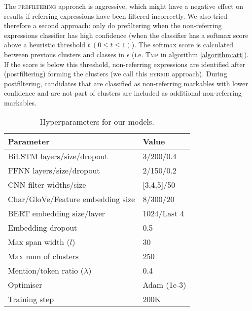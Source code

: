 \documentclass[10pt, a4paper]{article}
\newcommand{\ACRO}[1]{\textsc{#1}}
\newcommand{\PREFILTERING}{\ACRO{prefiltering}}
\newcommand{\HYBRID}{\ACRO{hybrid}}
\begin{document}
The {\PREFILTERING} approach is aggressive,  which might have a negative effect on results if referring expressions have been filtered incorrectly. 
We also tried therefore a second approach: only do prefiltering when the non-referring expressions classifier has high confidence (when the classifier has a softmax score above a heuristic threshold $t\ (0 \leq t \leq 1)$). The softmax score is calculated between previous clusters and classes in $\epsilon$ (i.e. \textsc{Tmp} in algorithm \ref{algorithm:att}). 
If the score is below this threshold,
non-referring expressions are identified after (postfiltering) forming the clusters (we call this {\HYBRID} approach). During postfiltering, candidates that are classified as non-referring markables with lower confidence and are not part of clusters are included as additional non-referring markables. 


\begin{table}[t]
    \centering
    \small
    \begin{tabular}{l l}
    \toprule
    \bf Parameter & \bf Value \\
    \midrule
    BiLSTM layers/size/dropout &3/200/0.4\\
FFNN layers/size/dropout & 2/150/0.2\\
CNN filter widths/size& [3,4,5]/50\\
Char/GloVe/Feature embedding size&8/300/20\\
BERT embedding size/layer&1024/Last 4\\
Embedding dropout & 0.5\\
    Max span width ($l$)&30\\
    Max num of clusters&250\\
    Mention/token ratio ($\lambda$) &0.4\\
    Optimiser & Adam (1e-3)\\
Training step & 200K\\
    \bottomrule
    \end{tabular}
    \caption{Hyperparameters for our models.}
    \label{table:config}
\end{table}
\end{document}
